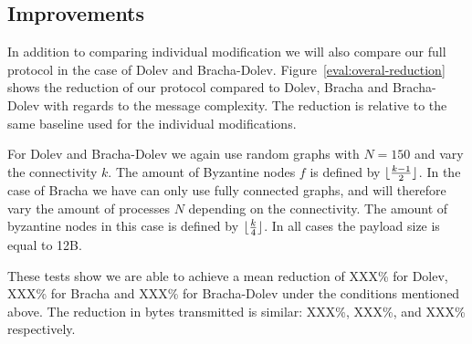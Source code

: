 
\subsection{Improvements}
In addition to comparing individual modification we will also compare our full protocol in the case of Dolev and Bracha-Dolev. Figure~\ref{eval:overal-reduction} shows the reduction of our protocol compared to Dolev, Bracha and Bracha-Dolev with regards to the message complexity. The reduction is relative to the same baseline used for the individual modifications.

For Dolev and Bracha-Dolev we again use random graphs with $N=150$ and vary the connectivity $k$. The amount of Byzantine nodes $f$ is defined by $\lfloor\frac{k-1}{2}\rfloor$. In the case of Bracha we have can only use fully connected graphs, and will therefore vary the amount of processes $N$ depending on the connectivity. The amount of byzantine nodes in this case is defined by $\lfloor\frac{k}{4}\rfloor$. In all cases the payload size is equal to 12B.

These tests show we are able to achieve a mean reduction of XXX\% for Dolev, XXX\% for Bracha and XXX\% for Bracha-Dolev under the conditions mentioned above. The reduction in bytes transmitted is similar: XXX\%, XXX\%, and XXX\% respectively.

